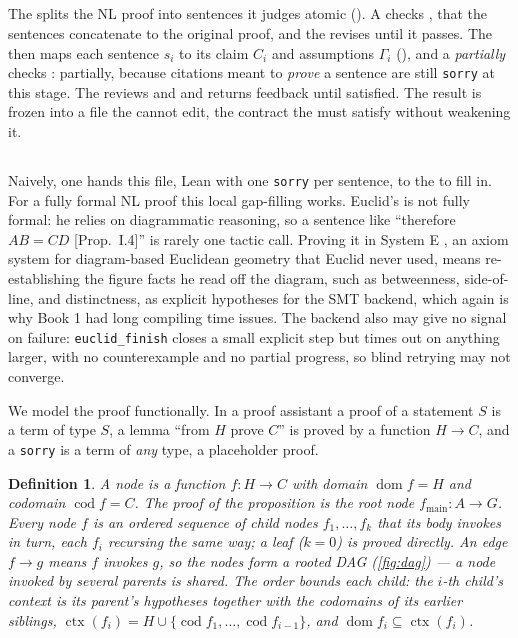\documentclass[letterpaper]{article} %
\newtheorem{definition}{Definition}
\begin{document}
\subsection{\mapstage}
The \llm splits the NL proof into sentences it judges atomic (\atomicity). A \script checks \coverage, that the sentences concatenate to the original proof, and the \llm revises until it passes. The \llm then maps each sentence $s_i$ to its claim $C_i$ and assumptions $\Gamma_i$ (\atomicfaithfulness), and a \script \emph{partially} checks \citcond: partially, because citations meant to \emph{prove} a sentence are still \texttt{sorry} at this stage. The \oracle reviews \atomicity and \atomicfaithfulness and returns feedback until satisfied. The result is frozen into a file the \llm cannot edit, the contract the \fillstage must satisfy without weakening it.

\subsection{\fillstage}
Naively, one hands this file, Lean with one \texttt{sorry} per sentence, to the \llm to fill in. For a fully formal NL proof this local gap-filling works. Euclid's is not fully formal: he relies on diagrammatic reasoning, so a sentence like ``therefore $AB=CD$ [Prop.~I.4]'' is rarely one tactic call. Proving it in System E \citep{avigad_formal_2009}, an axiom system for diagram-based Euclidean geometry that Euclid never used, means re-establishing the figure facts he read off the diagram, such as betweenness, side-of-line, and distinctness, as explicit hypotheses for the SMT backend, which again is why Book 1 \citep{murphy_autoformalizing_2024} had long compiling time issues. The backend also may give no signal on failure: \texttt{euclid\_finish} closes a small explicit step but times out on anything larger, with no counterexample and no partial progress, so blind retrying may not converge.

We model the proof functionally. In a proof assistant a proof of a statement $S$ is a term of type $S$, a lemma ``from $H$ prove $C$'' is proved by a function $H \to C$, and a \texttt{sorry} is a term of \emph{any} type, a placeholder proof.

\begin{definition}
A \emph{node} is a function $f\colon H \to C$ with domain $\operatorname{dom} f = H$ and codomain $\operatorname{cod} f = C$. The proof of the proposition is the root node $f_{\mathrm{main}}\colon A \to G$. Every node $f$ is an ordered sequence of child nodes $f_1,\dots,f_k$ that its body invokes in turn, each $f_i$ recursing the same way; a \emph{leaf} ($k=0$) is proved directly. An \emph{edge} $f \to g$ means $f$ invokes $g$, so the nodes form a rooted DAG (\cref{fig:dag}) --- a node invoked by several parents is shared. The order bounds each child: the $i$-th child's \emph{context} is its parent's hypotheses together with the codomains of its earlier siblings, $\operatorname{ctx}(f_i) = H \cup \{\operatorname{cod} f_1,\dots,\operatorname{cod} f_{i-1}\}$, and $\operatorname{dom} f_i \subseteq \operatorname{ctx}(f_i)$.
\end{definition}
\end{document}
